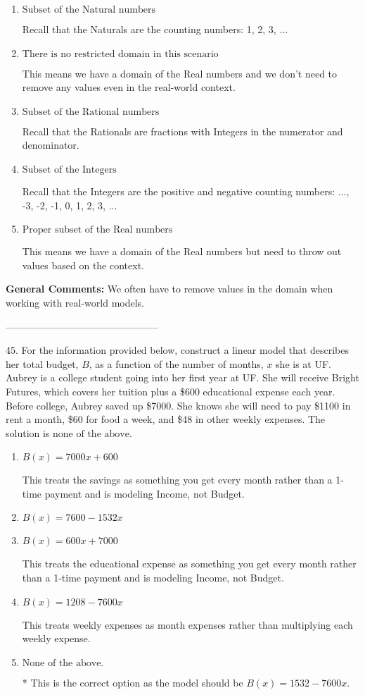 \documentclass{extbook}[14pt]
\begin{document}
\begin{enumerate}[label=\Alph*.] 
\item $ \text{Subset of the Natural numbers} $ 

 Recall that the Naturals are the counting numbers: 1, 2, 3, ... 
\item $ \text{There is no restricted domain in this scenario} $ 

 This means we have a domain of the Real numbers and we don't need to remove any values even in the real-world context. 
\item $ \text{Subset of the Rational numbers} $ 

 Recall that the Rationals are fractions with Integers in the numerator and denominator. 
\item $ \text{Subset of the Integers} $ 

 Recall that the Integers are the positive and negative counting numbers: ..., -3, -2, -1, 0, 1, 2, 3, ...  
\item $ \text{Proper subset of the Real numbers} $ 

 This means we have a domain of the Real numbers but need to throw out values based on the context. 
\end{enumerate} 
 
\textbf{General Comments:} We often have to remove values in the domain when working with real-world models.

-----------------------------------------------

45. For the information provided below, construct a linear model that describes her total budget, $B$, as a function of the number of months, $x$ she is at UF.
Aubrey is a college student going into her first year at UF. She will receive Bright Futures, which covers her tuition plus a \$600 educational expense each year. Before college, Aubrey saved up \$7000. She knows she will need to pay \$1100 in rent a month, \$60 for food a week, and \$48 in other weekly expenses. 
The solution is $ \text{none of the above.} $ 

\begin{enumerate}[label=\Alph*.] 
\item $ B(x) = 7000 x + 600 $ 

 This treats the savings as something you get every month rather than a 1-time payment and is modeling Income, not Budget. 
\item $ B(x) = 7600 - 1532 x $ 

  
\item $ B(x) = 600 x + 7000 $ 

 This treats the educational expense as something you get every month rather than a 1-time payment and is modeling Income, not Budget. 
\item $ B(x) = 1208 - 7600 x $ 

 This treats weekly expenses as month expenses rather than multiplying each weekly expense. 
\item $ \text{None of the above.} $ 

 * This is the correct option as the model should be $B(x) = 1532 - 7600 x$. 
\end{enumerate} 
 
\end{document}
